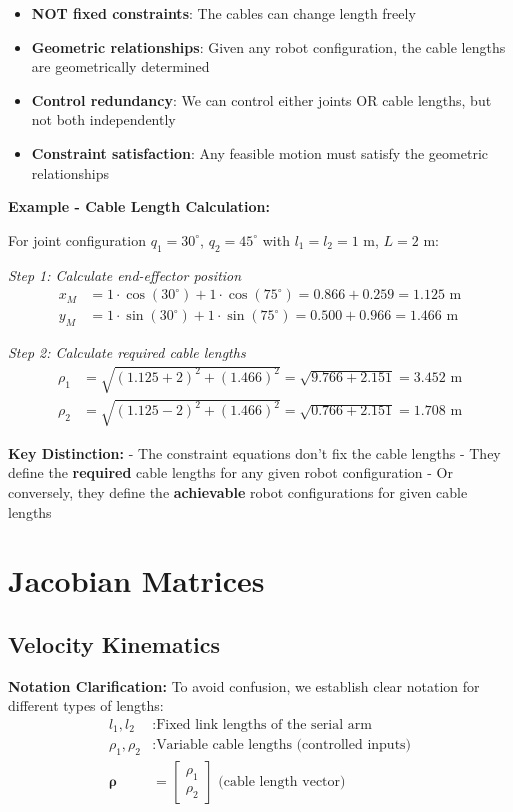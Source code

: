 \documentclass[11pt,a4paper]{article}
\begin{document}
\begin{itemize}
    \item \textbf{NOT fixed constraints}: The cables can change length freely
    \item \textbf{Geometric relationships}: Given any robot configuration, the cable lengths are geometrically determined
    \item \textbf{Control redundancy}: We can control either joints OR cable lengths, but not both independently
    \item \textbf{Constraint satisfaction}: Any feasible motion must satisfy the geometric relationships
\end{itemize}

\textbf{Example - Cable Length Calculation:}

For joint configuration $q_1 = 30^{\circ}$, $q_2 = 45^{\circ}$ with $l_1 = l_2 = 1$ m, $L = 2$ m:

\textit{Step 1: Calculate end-effector position}
\begin{align}
x_M &= 1 \cdot \cos(30^{\circ}) + 1 \cdot \cos(75^{\circ}) = 0.866 + 0.259 = 1.125 \text{ m} \\
y_M &= 1 \cdot \sin(30^{\circ}) + 1 \cdot \sin(75^{\circ}) = 0.500 + 0.966 = 1.466 \text{ m}
\end{align}

\textit{Step 2: Calculate required cable lengths}
\begin{align}
\rho_1 &= \sqrt{(1.125 + 2)^2 + (1.466)^2} = \sqrt{9.766 + 2.151} = 3.452 \text{ m} \\
\rho_2 &= \sqrt{(1.125 - 2)^2 + (1.466)^2} = \sqrt{0.766 + 2.151} = 1.708 \text{ m}
\end{align}

\textbf{Key Distinction:}
- The constraint equations don't fix the cable lengths
- They define the \textbf{required} cable lengths for any given robot configuration
- Or conversely, they define the \textbf{achievable} robot configurations for given cable lengths

\section{Jacobian Matrices}

\subsection{Velocity Kinematics}

\textbf{Notation Clarification:}
To avoid confusion, we establish clear notation for different types of lengths:
\begin{align}
l_1, l_2 &: \text{Fixed link lengths of the serial arm} \\
\rho_1, \rho_2 &: \text{Variable cable lengths (controlled inputs)} \\
\bm{\rho} &= \begin{bmatrix} \rho_1 \\ \rho_2 \end{bmatrix} \text{ (cable length vector)}
\end{align}
\end{document}
